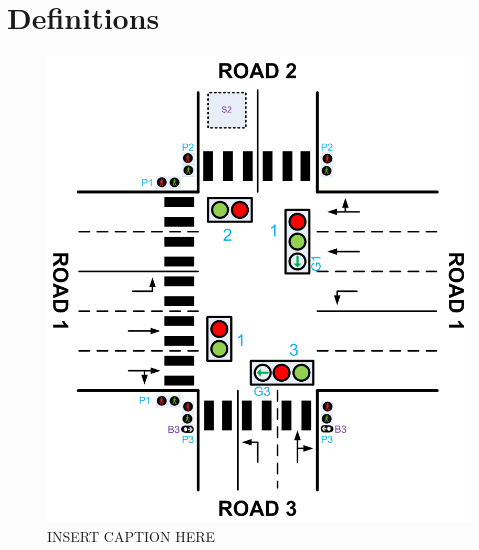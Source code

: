\documentclass[letterpaper]{article}
\begin{document}
\section{Definitions}
\label{Definitions}
\begin{figure}[h!]
 \centering
 \includegraphics[width=\textwidth]{intersection.png}
 \caption{INSERT CAPTION HERE}
 \label{intersection}
\end{figure}
\end{document}
